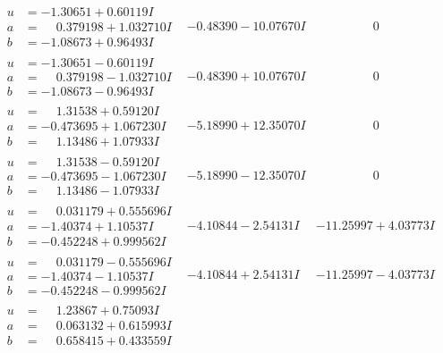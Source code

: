\documentclass[1p]{elsarticle_modified}
\theoremstyle{definition}
\begin{document}
$$\begin{array}{c|c|c}
 \hline 
\begin{aligned}
u &= -1.30651 + 0.60119 I \\
a &= \phantom{-}0.379198 + 1.032710 I \\
b &= -1.08673 + 0.96493 I\end{aligned}
 & -0.48390 - 10.07670 I & \phantom{-0.000000 } 0 \\ \hline\begin{aligned}
u &= -1.30651 - 0.60119 I \\
a &= \phantom{-}0.379198 - 1.032710 I \\
b &= -1.08673 - 0.96493 I\end{aligned}
 & -0.48390 + 10.07670 I & \phantom{-0.000000 } 0 \\ \hline\begin{aligned}
u &= \phantom{-}1.31538 + 0.59120 I \\
a &= -0.473695 + 1.067230 I \\
b &= \phantom{-}1.13486 + 1.07933 I\end{aligned}
 & -5.18990 + 12.35070 I & \phantom{-0.000000 } 0 \\ \hline\begin{aligned}
u &= \phantom{-}1.31538 - 0.59120 I \\
a &= -0.473695 - 1.067230 I \\
b &= \phantom{-}1.13486 - 1.07933 I\end{aligned}
 & -5.18990 - 12.35070 I & \phantom{-0.000000 } 0 \\ \hline\begin{aligned}
u &= \phantom{-}0.031179 + 0.555696 I \\
a &= -1.40374 + 1.10537 I \\
b &= -0.452248 + 0.999562 I\end{aligned}
 & -4.10844 - 2.54131 I & -11.25997 + 4.03773 I \\ \hline\begin{aligned}
u &= \phantom{-}0.031179 - 0.555696 I \\
a &= -1.40374 - 1.10537 I \\
b &= -0.452248 - 0.999562 I\end{aligned}
 & -4.10844 + 2.54131 I & -11.25997 - 4.03773 I \\ \hline\begin{aligned}
u &= \phantom{-}1.23867 + 0.75093 I \\
a &= \phantom{-}0.063132 + 0.615993 I \\
b &= \phantom{-}0.658415 + 0.433559 I\end{aligned}

\end{array}$$
\end{document}
